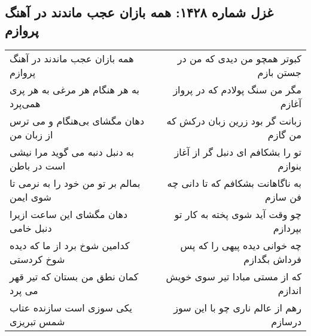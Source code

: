 \begin{center}
\section*{غزل شماره ۱۴۲۸: همه بازان عجب ماندند در آهنگ پروازم}
\label{sec:1428}
\begin{longtable}{l p{0.5cm} r}
همه بازان عجب ماندند در آهنگ پروازم
&&
کبوتر همچو من دیدی که من در جستن بازم
\\
به هر هنگام هر مرغی به هر پری همی‌پرد
&&
مگر من سنگ پولادم که در پرواز آغازم
\\
دهان مگشای بی‌هنگام و می ترس از زبان من
&&
زبانت گر بود زرین زبان درکش که من گازم
\\
به دنبل دنبه می گوید مرا نیشی است در باطن
&&
تو را بشکافم ای دنبل گر از آغاز بنوازم
\\
بمالم بر تو من خود را به نرمی تا شوی ایمن
&&
به ناگاهانت بشکافم که تا دانی چه فن سازم
\\
دهان مگشای این ساعت ازیرا دنبل خامی
&&
چو وقت آید شوی پخته به کار تو بپردازم
\\
کدامین شوخ برد از ما که دیده شوخ کردستی
&&
چه خوانی دیده پیهی را که پس فرداش بگدازم
\\
کمان نطق من بستان که تیر قهر می پرد
&&
که از مستی مبادا تیر سوی خویش اندازم
\\
یکی سوزی است سازنده عتاب شمس تبریزی
&&
رهم از عالم ناری چو با این سوز درسازم
\\
\end{longtable}
\end{center}
